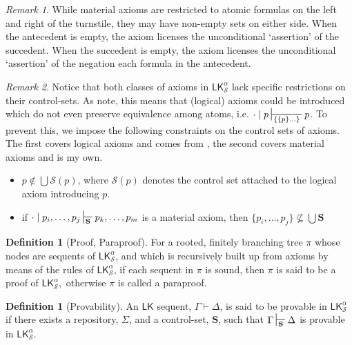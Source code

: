 \documentclass{article}                     %
\theoremstyle{theorem}
\theoremstyle{corollary}
\theoremstyle{lemma}
\theoremstyle{definition}
\newtheorem{definition}[section]{Definition}
\theoremstyle{remark}
\newtheorem{remark}{Remark}
\theoremstyle{definition}
\theoremstyle{notation}
\theoremstyle{definition}
\theoremstyle{proposition}
\theoremstyle{definition}
\begin{document}
\begin{remark}
	While material axioms are restricted to atomic formulas on the left and right of the turnstile, they may have non-empty sets on either side. When the antecedent is empty, the axiom licenses the unconditional `assertion' of the succedent. When the succedent is empty, the axiom licenses the unconditional `assertion' of the negation each formula in the antecedent.
\end{remark}
\begin{remark}
Notice that both classes of axioms in $\mathsf{LK}^\alpha_\mathcal{S} $ lack specific restrictions on their control-sets. As \textcite{Piazza2015} note, this means that (logical) axioms could be introduced which do not even preserve equivalence among atoms, i.e. $\cdot\mid p  \sststile{\{\{p\}\ldots\}}{} p $. To prevent this, we impose the following constraints on the control sets of axioms. The first covers logical axioms and comes from \textcite{Piazza2015}, the second covers material axioms and is my own.

\begin{itemize}
\item $p \not\in \bigcup\mathcal{S}(p)$, where $ \mathcal{S}(p) $ denotes the control set attached to the logical axiom introducing $ p $.

\item if $\cdot\mid  p_i,\ldots,p_j \sststile{\mathbf{S}}{} p_k,\ldots,p_m  $ is a material axiom, then $\{p_i,\ldots,p_j\}\not\subseteq \bigcup\mathbf{S}$

\end{itemize}
\end{remark}

\begin{definition}[Proof, Paraproof]\label{proof}
	For a rooted, finitely branching tree $ \pi $ whose nodes are sequents of $ \mathsf{LK}^\alpha_\mathcal{S} $, and which is recursively built up from axioms by means of the rules of $ \mathsf{LK}^\alpha_\mathcal{S} $, if each sequent in $ \pi $ is sound, then $ \pi $ is said to be a proof of $ \mathsf{LK}^\alpha_\mathcal{S} $, \,otherwise $ \pi $ is called a paraproof.
\end{definition}

\begin{definition}[Provability]
	An $ \mathsf{LK} $ sequent, $ \Gamma \vdash \Delta $, is said to be provable in $ \mathsf{LK}^\alpha_\mathcal{S} $ if there
	exists a repository, $\Sigma$, and a control-set, $ \mathbf{S} $, such that $ \Gamma \sststile{\mathbf{S}}{} \Delta  $ is provable in $ \mathsf{LK}^\alpha_\mathcal{S} $. 
\end{definition}
\end{document}
